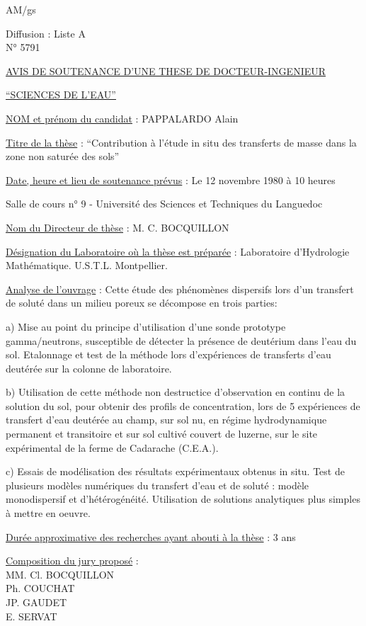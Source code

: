 AM/gs

Diffusion : Liste A\\
N° 5791

\begin{center}
\uline{AVIS DE SOUTENANCE D'UNE THESE DE DOCTEUR-INGENIEUR}

\uline{``SCIENCES DE L'EAU''}
\end{center}

\uline{NOM et prénom du candidat} : PAPPALARDO Alain

\uline{Titre de la thèse} : ``Contribution à l'étude in situ des transferts de masse dans la zone non saturée des sols''

\uline{Date, heure et lieu de soutenance prévus} : Le 12 novembre 1980 à 10 heures

Salle de cours n° 9 - Université des Sciences et Techniques du Languedoc

\uline{Nom du Directeur de thèse} : M. C. BOCQUILLON

\uline{Désignation du Laboratoire où la thèse est préparée} : Laboratoire d'Hydrologie Mathématique. U.S.T.L. Montpellier.

\uline{Analyse de l'ouvrage} : Cette étude des phénomènes dispersifs lors d'un transfert de soluté dans un milieu poreux se décompose en trois parties:

a) Mise au point du principe d'utilisation d'une sonde prototype gamma/neutrons, susceptible de détecter la présence de deutérium dans l'eau du sol. Etalonnage et test de la méthode lors d'expériences de transferts d'eau deutérée sur la colonne de laboratoire.

b) Utilisation de cette méthode non destructice d'observation en continu de la solution du sol, pour obtenir des profils de concentration, lors de 5 expériences de transfert d'eau deutérée au champ, sur sol nu, en régime hydrodynamique permanent et transitoire et sur sol cultivé couvert de luzerne, sur le site expérimental de la ferme de Cadarache (C.E.A.).

c) Essais de modélisation des résultats expérimentaux obtenus in situ. Test de plusieurs modèles numériques du transfert d'eau et de soluté : modèle monodispersif et d'hétérogénéité. Utilisation de solutions analytiques plus simples à mettre en oeuvre.

\uline{Durée approximative des recherches ayant abouti à la thèse} : 3 ans

\uline{Composition du jury proposé} :\\
MM. Cl. BOCQUILLON\\
Ph. COUCHAT\\
JP. GAUDET\\
E. SERVAT


